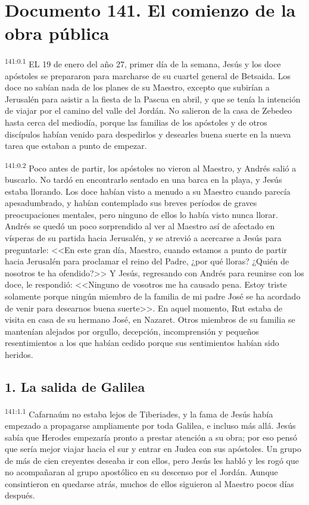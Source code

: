 \chapter{Documento 141. El comienzo de la obra pública}
\par 
\textsuperscript{141:0.1} EL 19 de enero del año 27, primer día de la semana, Jesús y los doce apóstoles se prepararon para marcharse de su cuartel general de Betsaida. Los doce no sabían nada de los planes de su Maestro, excepto que subirían a Jerusalén para asistir a la fiesta de la Pascua en abril, y que se tenía la intención de viajar por el camino del valle del Jordán. No salieron de la casa de Zebedeo hasta cerca del mediodía, porque las familias de los apóstoles y de otros discípulos habían venido para despedirlos y desearles buena suerte en la nueva tarea que estaban a punto de empezar.

\par 
\textsuperscript{141:0.2} Poco antes de partir, los apóstoles no vieron al Maestro, y Andrés salió a buscarlo. No tardó en encontrarlo sentado en una barca en la playa, y Jesús estaba llorando. Los doce habían visto a menudo a su Maestro cuando parecía apesadumbrado, y habían contemplado sus breves períodos de graves preocupaciones mentales, pero ninguno de ellos lo había visto nunca llorar. Andrés se quedó un poco sorprendido al ver al Maestro así de afectado en vísperas de su partida hacia Jerusalén, y se atrevió a acercarse a Jesús para preguntarle: <<En este gran día, Maestro, cuando estamos a punto de partir hacia Jerusalén para proclamar el reino del Padre, ¿por qué lloras? ¿Quién de nosotros te ha ofendido?>> Y Jesús, regresando con Andrés para reunirse con los doce, le respondió: <<Ninguno de vosotros me ha causado pena. Estoy triste solamente porque ningún miembro de la familia de mi padre José se ha acordado de venir para desearnos buena suerte>>. En aquel momento, Rut estaba de visita en casa de su hermano José, en Nazaret. Otros miembros de su familia se mantenían alejados por orgullo, decepción, incomprensión y pequeños resentimientos a los que habían cedido porque sus sentimientos habían sido heridos.

\section*{1. La salida de Galilea}
\par 
\textsuperscript{141:1.1} Cafarnaúm no estaba lejos de Tiberiades, y la fama de Jesús había empezado a propagarse ampliamente por toda Galilea, e incluso más allá. Jesús sabía que Herodes empezaría pronto a prestar atención a su obra; por eso pensó que sería mejor viajar hacia el sur y entrar en Judea con sus apóstoles. Un grupo de más de cien creyentes deseaba ir con ellos, pero Jesús les habló y les rogó que no acompañaran al grupo apostólico en su descenso por el Jordán. Aunque consintieron en quedarse atrás, muchos de ellos siguieron al Maestro pocos días después.

